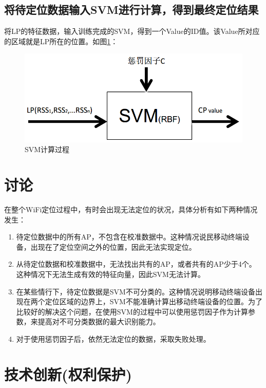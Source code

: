 \documentclass[a4paper, UTF8]{ctexart}
\begin{document}
\subsection{将待定位数据输入SVM进行计算，得到最终定位结果}
将LP的特征数据，输入训练完成的SVM，得到一个Value的ID值。该Value所对应的区域就是LP所在的位置。如图\ref{fig:no10}：
\begin{figure}[!ht]\centering
  \includegraphics[keepaspectratio, scale=0.5]{no10.png}
  \caption{SVM计算过程\label{fig:no10}} 
\end{figure}

\section{讨论}
在整个WiFi定位过程中，有时会出现无法定位的状况，具体分析有如下两种情况发生：
\begin{enumerate}
\item 待定位数据中的所有AP，不包含在校准数据中。这种情况说民移动终端设备，出现在了定位空间之外的位置，因此无法实现定位。
\item 从待定位数据和校准数据中，无法找出共有的AP，或者共有的AP少于4个。这种情况下无法生成有效的特征向量，因此SVM无法计算。
\item 在某些情行下，待定位数据是SVM不可分类的。这种情况说明移动终端设备出现在两个定位区域的边界上，SVM不能准确计算出移动终端设备的位置。为了比较好的解决这个问题，在使用SVM的过程中可以使用惩罚因子作为计算参数，来提高对不可分类数据的最大识别能力。
\item 对于使用惩罚因子后，依然无法定位的数据，采取失败处理。
\end{enumerate}


\section{技术创新(权利保护)}
\end{document}
